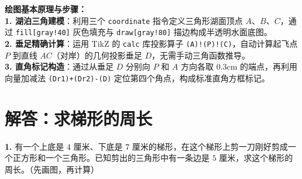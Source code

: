 \documentclass[12pt, a4paper]{ctexrep}
\begin{document}
\vspace{0.6cm}

{\small\color{blue!70!black}
\textbf{绘图基本原理与步骤：}\\
\textbf{1. 湖泊三角建模}：利用三个 \texttt{coordinate} 指令定义三角形湖面顶点 $A$、$B$、$C$，通过 \texttt{fill[gray!40]} 灰色填充与 \texttt{draw[gray!80]} 描边构成半透明水面底图。\\
\textbf{2. 垂足精确计算}：运用 TikZ 的 \texttt{calc} 库投影算子 \texttt{(A)!(P)!(C)}，自动计算起飞点 $P$ 到直线 $AC$（对岸）的几何投影垂足 $D$，无需手动三角函数推导。\\
\textbf{3. 直角标记构造}：通过从垂足 $D$ 分别向 $P$ 和 $A$ 方向各取 0.3cm 的端点，再利用向量加减法 \texttt{(Dr1)+(Dr2)-(D)} 定位第四个角点，构成标准直角方框标记。
}


\newpage

\section{解答：求梯形的周长}

\vspace{0.4cm}

\noindent\textbf{1.} 有一个上底是 $4$ 厘米、下底是 $7$ 厘米的梯形，在这个梯形上剪一刀刚好剪成一个正方形和一个三角形。已知剪出的三角形中有一条边是 $5$ 厘米，求这个梯形的周长。（先画图，再计算）

\vspace{0.8cm}

\begin{center}
\end{center}
\end{document}
